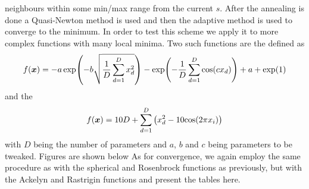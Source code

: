     neighbours within some min/max range from the current $s$\cite{simaneal}.
    After the annealing is done a Quasi-Newton method is used and then the
    adaptive method is used to converge to the minimum. In order to test this
    scheme we apply it to more complex functions with many local minima. Two
    such functions are the \cite{simulationlib} defined
    as
        \begin{equation}
            f(\blds{x}) = -a\exp(-b\sqrt{\frac{1}{D}\suml{d=1}{D}x^2_d}) -
            \exp(-\frac{1}{D}\suml{d=1}{D}\text{cos}(cx_d)) + a + \exp(1)
        \end{equation}
    and the \cite{simulationlib}
        \begin{equation}
            f(\blds{x}) = 10D + \suml{d=1}{D}\left(x^2_d - 10\text{cos}(2\pi
            x_i)\right)
        \end{equation}
    with $D$ being the number of parameters and $a$, $b$ and $c$ being
    parameters to be tweaked. Figures are shown below
    As for convergence, we again employ the same procedure as with the
    spherical and Rosenbrock functions as previously, but with the Ackelyn and
    Rastrigin functions and present the tables here.
